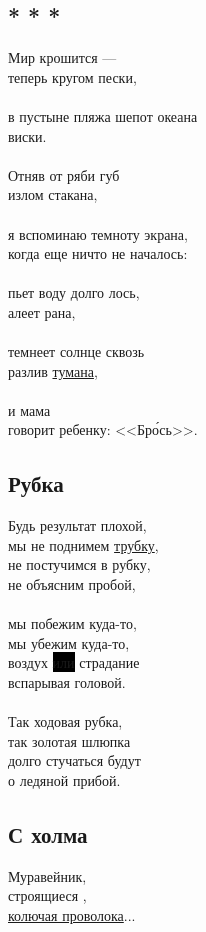 \documentclass[12pt,a5paper]{report}
\newcommand*\circled[1]{%
   \begin{tikzpicture}[baseline=(C.base)]
     \node[draw,circle,inner sep=1pt](C) {#1};
   \end{tikzpicture}}
\newcommand{\hl}[1]{\colorbox{black}{#1}} %
\begin{document}
\subsection[<<Мир крошится...>>]{* * *}
\label{peski}
Мир крошится ---\\
теперь кругом пески,\\
\\
в пустыне пляжа шепот океана\\
\hl{\phantom{пропущено пропущено}} виски.\\
\\
Отняв от ряби губ\\
излом стакана,\\
\\
я вспоминаю темноту экрана,\\
когда еще ничто не началось:\\
\\
пьет воду долго лось,\\
алеет рана,\\
\\
темнеет солнце сквозь\\
разлив \hyperref[tuman]{тумана},\\
\\
и мама\\
говорит ребенку: <<Бр\'{о}сь>>.
\newpage


\subsection{Рубка}
\label{rubka}
Будь результат плохой,\\
мы не поднимем \hyperref[kisti]{трубку},\\
не постучимся в рубку,\\
не объясним пробой,\\
\\
мы побежим куда-то,\\
мы убежим куда-то,\\
воздух \hl{или} страдание\\
вспарывая головой.\\
\\
Так ходовая рубка,\\
так золотая шлюпка\\
долго стучаться будут\\
о ледяной прибой.\\
\newpage



\subsection{С холма}
\label{holma}
Муравейник,\\
строящиеся \fbox{\circled{а}},\\
\hyperref[vodoochistki]{колючая проволока}...\\
\end{document}
